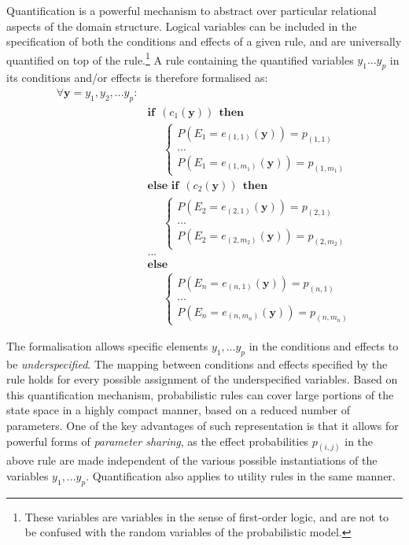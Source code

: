 Quantification is a powerful mechanism to abstract over particular relational aspects of the domain structure.  Logical variables can be included in the specification of both the conditions and effects of a given rule, and are universally quantified on top of the rule.\footnote{These variables are variables in the sense of first-order logic, and are not to be confused with the random variables of the probabilistic model.}  A rule containing the quantified variables $y_1...y_p$ in its conditions and/or effects is therefore formalised as:
\begin{equation}
\begin{aligned}
\forall \mathbf{y} = y_1, y_2,...y_p: \\
& \textbf{if} \ \ (c_{1}(\mathbf{y})) \ \ \textbf{then} \\ 
& \;\;\;\;\; \begin{cases}
P(E_1\!=\!e_{(1,1)}(\mathbf{y})) = p_{(1,1)} \\
 ... \\
P(E_1\!=\!e_{(1,m_1)}(\mathbf{y})) = p_{(1,m_1)} 
\end{cases} \\[3mm]
& \textbf{else if} \ \ (c_{2}(\mathbf{y})) \ \ \textbf{then} \\ 
& \;\;\;\;\; \begin{cases}
P(E_2\!=\!e_{(2,1)}(\mathbf{y})) = p_{(2,1)} \\
 ... \\
P(E_2\!=\!e_{(2,m_2)}(\mathbf{y})) = p_{(2,m_2)} 
\end{cases} \\ 
& ...  \\
& \textbf{else} \\
& \;\;\;\;\; \begin{cases}
P(E_n\!=\!e_{(n,1)}(\mathbf{y})) = p_{(n,1)} \\
... \\
P(E_n\!=\!e_{(n,m_n)}(\mathbf{y})) = p_{(n,m_n)}
\end{cases}
\end{aligned}
\label{eq:rulewithquant}
\end{equation}

The formalisation allows specific elements $y_1,...y_p$ in the conditions and effects to be \textit{underspecified}.  The mapping between conditions and effects specified by the rule holds for every possible assignment of the underspecified variables. Based on this quantification mechanism, probabilistic rules can cover large portions of the state space in a highly compact manner, based on a reduced number of parameters. One of the key advantages of such representation is that it allows for powerful forms of \textit{parameter sharing}, as the effect probabilities $p_{(i,j)}$ in the above rule are made independent of the various possible instantiations of the variables $y_1,...y_p$. Quantification also applies to utility rules in the same manner. 


